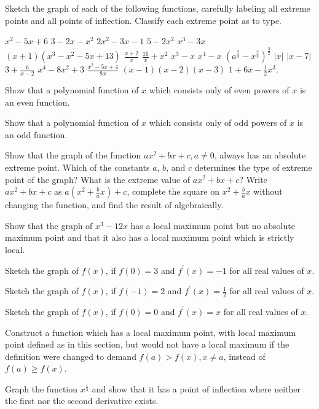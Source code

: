 \begin{exercises}

Sketch the graph of each of the following functions,
carefully labeling all extreme points and all points of
inflection.  Classify each extreme point as to type.
\begin{exenum}
\sx
$x^2 - 5x + 6$
\sx
$3 - 2x - x^2$
\sx
$2x^2 - 3x - 1$
\sx
$5-2x^2$
\sx
$x^3 - 3x$
\sx
$(x+1)(x^3 - x^2 - 5x + 13)$
\sx
$\frac{x+2}x$
\sx
$\frac{16}x + x^2$
\sx
$x^3 - x$
\sx
$x^4 - x$
\sx
$(a^\frac23 - x^\frac23)^\frac32$
\sx
$|x|$
\sx
$|x-7|$
\sx
$3 + \frac6{x-2}$
\sx
$x^4 - 8x^2 + 3$
\sx
$\frac{x^2 - 5x + 4}{8x}$
\sx
$(x-1)(x-2)(x-3)$
\sx
$1+6x - \frac12x^3$.
\end{exenum}

Show that a polynomial function of $x$ which consists
only of even powers of $x$ is an even function.

Show that a polynomial function of $x$ which consists
only of odd powers of $x$ is an odd function.

\begin{exenum}
\sx
Show that the graph of the function
$ax^2 + bx + c, a \ne 0$, always has an absolute extreme point.
\sx
Which of the constants $a$, $b$, and $c$ determines
the type of extreme point of the graph?
\sx
{}
What is the extreme value of
$ax^2 + bx + c$?
\sx
Write $ax^2 + bx + c$ as $a \left( x^2 + \frac ba x \right) + c$,
complete the square on $x^2 + \frac ba x$ without changing
the function, and find the result of  algebraically.
\end{exenum}

Show that the graph of $x^3 - 12x$ has a local maximum point
but no absolute maximum point and that it also has a local
maximum point which is strictly local.

Sketch the graph of $f(x)$, if $f(0)=3$
and $f^\prime (x) = -1$ for all real values of $x$.

Sketch the graph of $f(x)$, if $f(-1)=2$
and $f^\prime (x) = \frac12$ for all real values of $x$.

Sketch the graph of $f(x)$, if $f(0)=0$
and $f^\prime (x) = x$ for all real values of $x$.

Construct a function which has a local maximum point,
with local maximum point defined as in this section, but would
not have a local maximum if the definition were changed to demand
$f(a) > f(x), x \ne a$, instead of $f(a) \geq f(x)$.

Graph the function $x^\frac13$ and show that it has a point of
inflection where neither the first nor the second
derivative exists.

\end{exercises}
